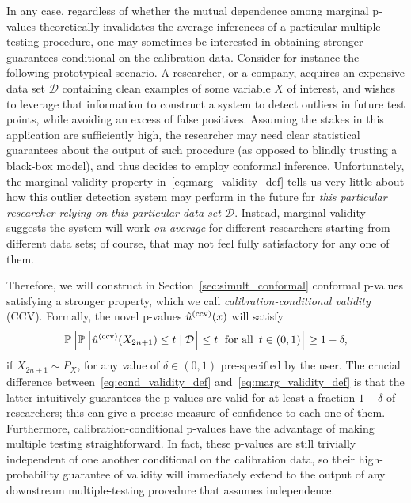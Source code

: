 \documentclass[11pt]{article}
\def\cond{\textnormal{(ccv)}}
\begin{document}
In any case, regardless of whether the mutual dependence among marginal p-values theoretically invalidates the average inferences of a particular multiple-testing procedure, one may sometimes be interested in obtaining stronger guarantees conditional on the calibration data.
Consider for instance the following prototypical scenario. 
A researcher, or a company, acquires an expensive data set $\mathcal{D}$ containing clean examples of some variable $X$ of interest, and wishes to leverage that information to construct a system {to} detect outliers in future test points, while avoiding an excess of false positives. Assuming the stakes in this application are sufficiently high, the researcher may need clear statistical guarantees about the output of such procedure (as opposed to blindly trusting a black-box model), and thus decides to employ conformal inference. Unfortunately, the marginal validity property in~\eqref{eq:marg_validity_def} tells us very little about how this outlier detection system may perform in the future for {\em this particular researcher relying on this particular data set $\mathcal{D}$}. Instead, marginal validity suggests the system will work {\em on average} for different researchers starting from different data sets; of course, that may not feel fully satisfactory for any one of them.

Therefore, we will construct in Section~\ref{sec:simult_conformal} conformal p-values satisfying a stronger property, which we call \emph{calibration-conditional validity} (CCV). Formally, the novel p-values $\hat{u}^\cond(x)$ will satisfy
\begin{equation}  \label{eq:cond_validity_def}
    \mathbb{P}\left[ \mathbb{P}\left[ \hat{u}^\cond(X_{2n+1}) \leq t \mid \mathcal{D} \right] \leq t \text{\; for all \,} t \in (0,1) \right] \geq 1-\delta,
\end{equation}
if $X_{2n+1} \sim P_X$, for any value of $\delta \in (0,1)$ pre-specified by the user.
The crucial difference between~\eqref{eq:cond_validity_def} and~\eqref{eq:marg_validity_def} is that the latter intuitively guarantees the p-values are valid for at least a fraction $1 - \delta$ of researchers; this can give a precise measure of confidence {to each one of them.}
Furthermore, calibration-conditional p-values have the advantage of making multiple testing straightforward. In fact, these p-values are still trivially independent of one another conditional on the calibration data, so their high-probability guarantee of validity will immediately extend to the output of any downstream multiple-testing procedure that assumes independence.
\end{document}
